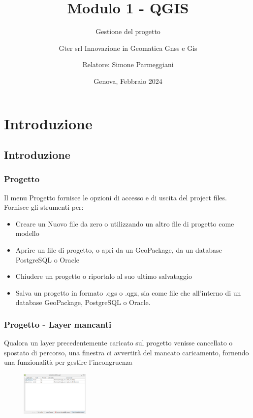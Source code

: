 \documentclass{beamer}
\title{Modulo 1 - QGIS}
\subtitle{Gestione del progetto}
\author[]{Gter srl Innovazione in Geomatica Gnss e Gis}
\author[]{Relatore: Simone Parmeggiani}
\date{Genova, Febbraio 2024}
\begin{document}
	{
		{
			\begin{frame}
				\titlepage
			\end{frame}
		}
		\addtocounter{framenumber}{-1}

\section{Introduzione}
\subsection{Introduzione}

\begin{frame}
   \frametitle{Progetto}

   Il menu Progetto fornisce le opzioni di accesso e di uscita del project files. Fornisce gli strumenti per:

   \begin{itemize}
            \item  Creare un Nuovo file da zero o utilizzando un altro file di progetto come modello
            \item Aprire un file di progetto, o apri da un GeoPackage, da un database PostgreSQL o Oracle
            \item Chiudere un progetto o riportalo al suo ultimo salvataggio
            \item Salva un progetto in formato .qgs o .qgz, sia come file che all’interno di un database GeoPackage, PostgreSQL o Oracle.
    \end{itemize}       
\end{frame}

\begin{frame}
   \frametitle{Progetto - Layer mancanti}

   Qualora un layer precedentemente caricato sul progetto venisse cancellato o spostato di percorso, una finestra ci avvertirà del mancato caricamento, fornendo una funzionalità per gestire l'incongruenza

    \begin{figure}[h]
        \centering
        \includegraphics[width=0.3\textwidth]{corso2023/progetto.png}
    \end{figure}     
\end{frame}

}
\end{document}
